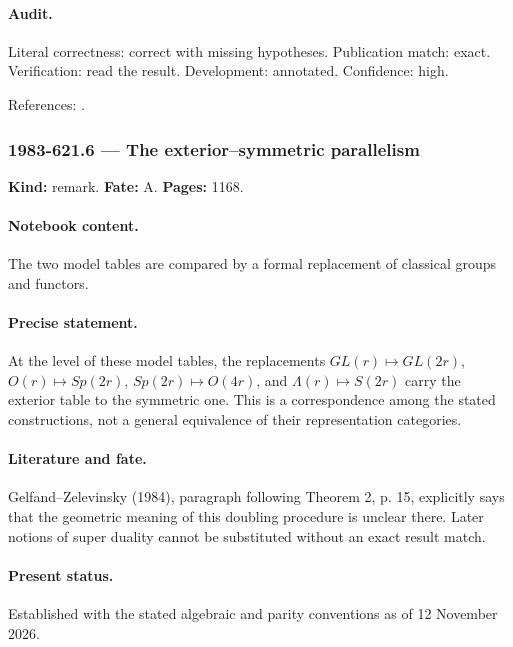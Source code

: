 \paragraph{Audit.} Literal correctness: correct with missing hypotheses. Publication match: exact. Verification: read the result. Development: annotated. Confidence: high.

\noindent References: \citep{gelfandzelevinsky1984models}.\par

\subsubsection{1983-621.6 --- The exterior–symmetric parallelism}

\label{item:1983-621.6}

\noindent\textbf{Kind:} remark. \textbf{Fate:} A. \textbf{Pages:} 1168.\par

\paragraph{Notebook content.} The two model tables are compared by a formal replacement of classical groups and functors.

\paragraph{Precise statement.} At the level of these model tables, the replacements \(GL(r)\mapsto GL(2r)\), \(O(r)\mapsto Sp(2r)\), \(Sp(2r)\mapsto O(4r)\), and \(\Lambda(r)\mapsto S(2r)\) carry the exterior table to the symmetric one. This is a correspondence among the stated constructions, not a general equivalence of their representation categories.

\paragraph{Literature and fate.} Gelfand–Zelevinsky (1984), paragraph following Theorem 2, p. 15, explicitly says that the geometric meaning of this doubling procedure is unclear there. Later notions of super duality cannot be substituted without an exact result match.

\paragraph{Present status.} Established with the stated algebraic and parity conventions as of 12 November 2026.


